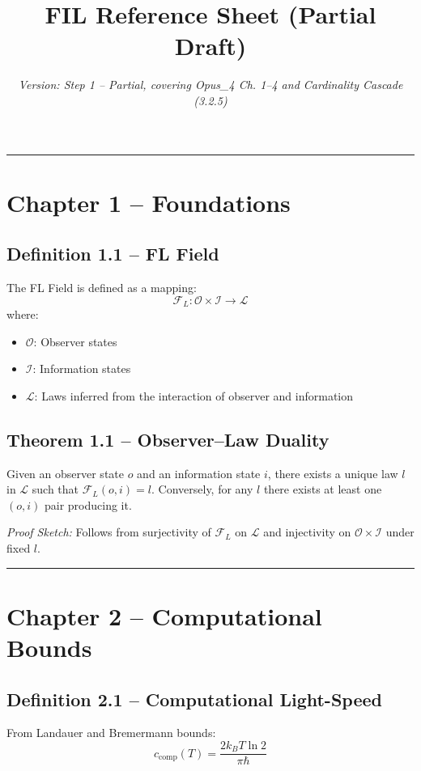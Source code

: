 \documentclass{article}
\title{FIL Reference Sheet (Partial Draft)}
\author{}
\date{\emph{Version: Step 1 – Partial, covering Opus\_4 Ch. 1–4 and Cardinality Cascade (3.2.5)}}
\begin{document}
\maketitle

\vspace{1em}
\hrule
\vspace{1em}

\section{Chapter 1 – Foundations}

\subsection{Definition 1.1 – FL Field}
The FL Field is defined as a mapping:
\[
\mathcal{F}_L : \mathcal{O} \times \mathcal{I} \to \mathcal{L}
\]
where:
\begin{itemize}
\item \( \mathcal{O} \): Observer states
\item \( \mathcal{I} \): Information states
\item \( \mathcal{L} \): Laws inferred from the interaction of observer and information
\end{itemize}

\subsection{Theorem 1.1 – Observer–Law Duality}
Given an observer state \(o\) and an information state \(i\), there exists a unique law \(l\) in \( \mathcal{L} \) such that \( \mathcal{F}_L(o,i) = l \). Conversely, for any \(l\) there exists at least one \((o,i)\) pair producing it.

\emph{Proof Sketch:} Follows from surjectivity of \( \mathcal{F}_L \) on \( \mathcal{L} \) and injectivity on \( \mathcal{O} \times \mathcal{I} \) under fixed \(l\).

\hrule

\section{Chapter 2 – Computational Bounds}

\subsection{Definition 2.1 – Computational Light-Speed}
From Landauer and Bremermann bounds:
\[
c_{\mathrm{comp}}(T) = \frac{2 k_B T \ln 2}{\pi \hbar}
\]
\end{document}
